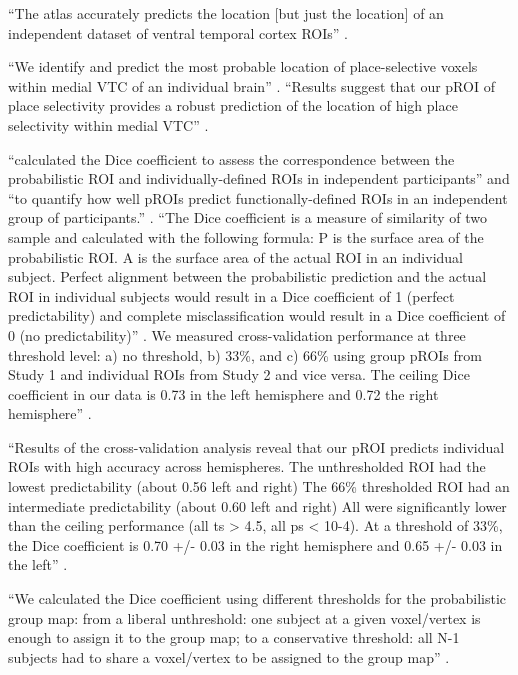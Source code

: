 %
``The atlas accurately predicts the location [but just the location] of an
independent dataset of ventral temporal cortex ROIs''
\citep{rosenke2021probabilistic}.

%
``We identify and predict the most probable location of place-selective voxels
within medial VTC of an individual brain'' \citep{weiner2018defining}.
%
``Results suggest that our pROI of place selectivity provides a robust
prediction of the location of high place selectivity within medial VTC''
\citep{weiner2018defining}.


%
\citet{weiner2018defining} ``calculated the Dice coefficient to assess the
correspondence between the probabilistic ROI and individually-defined ROIs in
independent participants'' and ``to quantify how well pROIs predict
functionally-defined ROIs in an independent group of participants.''
\citep{weiner2018defining}.
%
``The Dice coefficient is a measure of similarity of two sample and calculated
with the following formula:
%
P is the surface area of the probabilistic ROI.
%
A is the surface area of the actual ROI in an individual subject.
%
Perfect alignment between the probabilistic prediction and the actual ROI in
individual subjects would result in a Dice coefficient of 1 (perfect
predictability) and complete misclassification would result in a Dice
coefficient of 0 (no predictability)'' \citep{weiner2018defining}.
%
We measured cross-validation performance at three threshold level:
%
a) no threshold, b) 33\%, and c) 66\%
%
using group pROIs from Study 1 and individual ROIs from Study 2 and vice versa.
%
The ceiling Dice coefficient in our data is 0.73 in the left hemisphere and 0.72
the right hemisphere'' \citep{weiner2018defining}.

``Results of the cross-validation analysis reveal that our pROI predicts
individual ROIs with high accuracy across hemispheres.
%
The unthresholded ROI had the lowest predictability (about 0.56 left and right)
%
The 66\% thresholded ROI had an intermediate predictability (about 0.60 left and
right)
%
All were significantly lower than the ceiling performance (all ts > 4.5, all ps
< 10-4).
%
At a threshold of 33\%, the Dice coefficient is 0.70 +/- 0.03 in the right
hemisphere and 0.65 +/- 0.03 in the left'' \citep{weiner2018defining}.

%
``We calculated the Dice coefficient using different thresholds for the
probabilistic group map:
%
from a liberal unthreshold: one subject at a given voxel/vertex is enough to
assign it to the group map;
%
to a conservative threshold: all N-1 subjects had to share a voxel/vertex to be
assigned to the group map'' \citet{rosenke2021probabilistic}.


